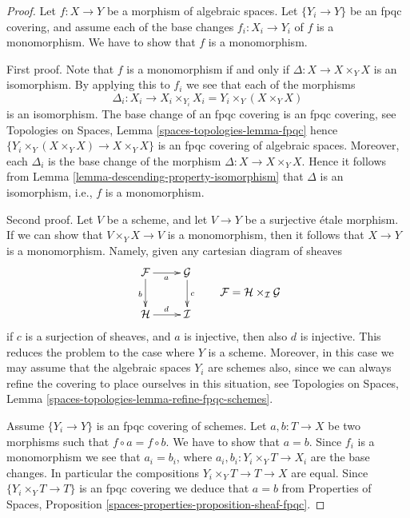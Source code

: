 \documentclass[10pt,a4paper]{amsart}
\theoremstyle{plain}
\theoremstyle{definition}
\theoremstyle{remark}
\numberwithin{equation}{subsection}
\begin{document}
\begin{proof}
Let $f : X \to Y$ be a morphism of algebraic spaces.
Let $\{Y_i \to Y\}$ be an fpqc covering, and assume
each of the base changes $f_i : X_i \to Y_i$ of $f$ is
a monomorphism. We have to show that $f$ is a monomorphism.

\medskip\noindent
First proof. Note that $f$ is a monomorphism if and only if
$\Delta : X \to X \times_Y X$ is an isomorphism. By applying this to
$f_i$ we see that each of the morphisms
$$
\Delta_i :
X_i
\longrightarrow
X_i \times_{Y_i} X_i = Y_i \times_Y (X \times_Y X)
$$
is an isomorphism. The base change of an fpqc covering is an fpqc covering, see
Topologies on Spaces, Lemma \ref{spaces-topologies-lemma-fpqc}
hence $\{Y_i \times_Y (X \times_Y X) \to X \times_Y X\}$
is an fpqc covering of algebraic spaces. Moreover, each
$\Delta_i$ is the base change of the morphism
$\Delta : X \to X \times_Y X$. Hence it follows from
Lemma \ref{lemma-descending-property-isomorphism}
that $\Delta$ is an isomorphism, i.e., $f$ is a monomorphism.

\medskip\noindent
Second proof.
Let $V$ be a scheme, and let $V \to Y$ be a surjective \'etale morphism.
If we can show that $V \times_Y X \to V$ is a monomorphism, then it
follows that $X \to Y$ is a monomorphism. Namely, given any
cartesian diagram of sheaves
$$
\vcenter{
\xymatrix{
\mathcal{F} \ar[r]_a \ar[d]_b & \mathcal{G} \ar[d]^c \\
\mathcal{H} \ar[r]^d & \mathcal{I}
}
}
\quad
\quad
\mathcal{F} = \mathcal{H} \times_\mathcal{I} \mathcal{G}
$$
if $c$ is a surjection of sheaves, and $a$ is injective, then also
$d$ is injective. This reduces the problem to the case where $Y$ is
a scheme. Moreover, in this case we may assume that the algebraic spaces
$Y_i$ are schemes also, since we can always refine the covering to place
ourselves in this situation, see
Topologies on Spaces, Lemma \ref{spaces-topologies-lemma-refine-fpqc-schemes}.

\medskip\noindent
Assume $\{Y_i \to Y\}$ is an fpqc covering of schemes.
Let $a, b : T \to X$ be two morphisms
such that $f \circ a = f \circ b$. We have to show that $a = b$.
Since $f_i$ is a monomorphism we see that $a_i = b_i$, where
$a_i, b_i : Y_i \times_Y T \to X_i$ are
the base changes. In particular the compositions
$Y_i \times_Y T \to T \to X$ are equal.
Since $\{Y_i \times_Y T \to T\}$ is an fpqc covering we
deduce that $a = b$ from Properties of Spaces, Proposition
\ref{spaces-properties-proposition-sheaf-fpqc}.
\end{proof}
\end{document}
